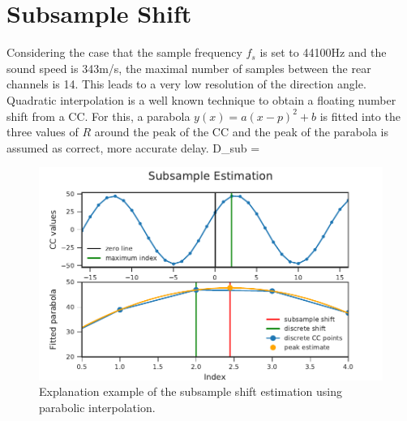 \section{Subsample Shift}
\label{sec:02_subsampleShift}

Considering the case that the sample frequency $f_s$ is set to 44100\si{Hz}
and the sound speed is 343\si{m/s}, the maximal number of samples
between the rear channels is 14.
This leads to a very low resolution of the direction angle.
Quadratic interpolation is a well known technique to obtain a floating number
shift from a \ac{CC}.
For this, a parabola $y(x) = a(x-p)^2+b$ is fitted into the three values of $R$ around the peak
of the \ac{CC} and the peak of the parabola is assumed as correct, more accurate
delay.
\bal
	D_{sub} = \frac{\alpha - \gamma}{2 \cdot (\alpha - 2\beta + \gamma)}
	\label{eq:02_subsample}
\eal
\begin{figure}[ht]
	\centering
		\includegraphics[]{figures/subsample_shift}
	\caption{Explanation example of the subsample shift estimation using parabolic interpolation.}
    \label{fig:02_subsampleShift}
\end{figure}
